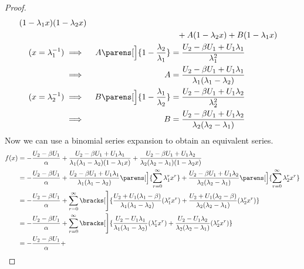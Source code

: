 \begin{proof}
\begin{alignat*}
                     (1 - \lambda_1 x)(1 - \lambda_2 x) \\
  && &\phantom{\equiv} + A(1 - \lambda_2 x) + B(1 - \lambda_1 x) \\
  (x = \lambda_1^{-1}) \implies{}&&
   A\parens[\Big]{1 - \frac{\lambda_2}{\lambda_1}}
   &= \frac{U_2 - \beta U_1 + U_1 \lambda_1}{\lambda_1^2} \\
  \implies{}&& A &= \frac{U_2 - \beta U_1 + U_1 \lambda_1}
                         {\lambda_1(\lambda_1 - \lambda_2)} \\
  (x = \lambda_2^{-1}) \implies{}&&
   B\parens[\Big]{1 - \frac{\lambda_1}{\lambda_2}}
   &= \frac{U_2 - \beta U_1 + U_1 \lambda_2}{\lambda_2^2} \\
  \implies{}&& B &= \frac{U_2 - \beta U_1 + U_1 \lambda_2}
                         {\lambda_2(\lambda_2 - \lambda_1)}
 \end{alignat*}
 Now we can use a binomial series expansion to obtain an equivalent series.
 \begin{align*}
  f(x) &= -\frac{U_2 - \beta U_1}\alpha +
           \frac{U_2 - \beta U_1 + U_1 \lambda_1}
                {\lambda_1(\lambda_1 - \lambda_2)(1 - \lambda_1 x)} +
           \frac{U_2 - \beta U_1 + U_1 \lambda_2}
                {\lambda_2(\lambda_2 - \lambda_1)(1 - \lambda_2 x)} \\
       &= -\frac{U_2 - \beta U_1}\alpha +
           \frac{U_2 - \beta U_1 + U_1 \lambda_1}
                {\lambda_1(\lambda_1 - \lambda_2)}
                \parens[\Big]{\sum_{r = 0}^\infty \lambda_1^r x^r} +
           \frac{U_2 - \beta U_1 + U_1 \lambda_2}
                {\lambda_2(\lambda_2 - \lambda_1)}
                \parens[\Big]{\sum_{r = 0}^\infty \lambda_2^r x^r} \\
       &= -\frac{U_2 - \beta U_1}\alpha +
          \sum_{r = 0}^\infty \bracks[\Bigg]{
           \frac{U_2 + U_1(\lambda_1 - \beta)}
                {\lambda_1(\lambda_1 - \lambda_2)}
            (\lambda_1^r x^r) +
           \frac{U_2 + U_1(\lambda_2 - \beta)}
                {\lambda_2(\lambda_2 - \lambda_1)}
            (\lambda_2^r x^r)
          } \\
       &= -\frac{U_2 - \beta U_1}\alpha +
          \sum_{r = 0}^\infty \bracks[\Bigg]{
           \frac{U_2 - U_1 \lambda_1}
                {\lambda_1(\lambda_1 - \lambda_2)}
            (\lambda_1^r x^r) +
           \frac{U_2 - U_1 \lambda_2}
                {\lambda_2(\lambda_2 - \lambda_1)}
            (\lambda_2^r x^r)
          } \\
       &= -\frac{U_2 - \beta U_1}\alpha +

\end{align*}
\end{proof}
